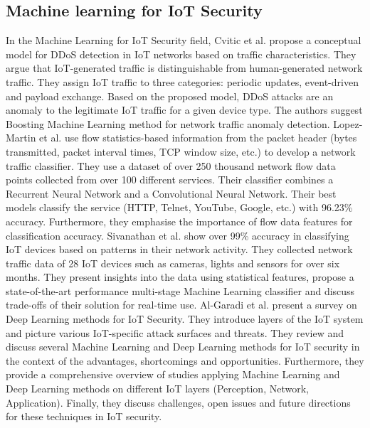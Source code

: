 \documentclass[conference]{IEEEtran}
\begin{document}
\subsection{Machine learning for IoT Security}
In the Machine Learning for IoT Security field, Cvitic et al. propose a conceptual model for DDoS detection in IoT networks based on traffic characteristics.
They argue that IoT-generated traffic is distinguishable from human-generated network traffic.
They assign IoT traffic to three categories: periodic updates, event-driven and payload exchange.
Based on the proposed model, DDoS attacks are an anomaly to the legitimate IoT traffic for a given device type.
The authors suggest Boosting Machine Learning method for network traffic anomaly detection.
Lopez-Martin et al. use flow statistics-based information from the packet header (bytes transmitted, packet interval times, TCP window size, etc.) to develop a network traffic classifier.
They use a dataset of over 250 thousand network flow data points collected from over 100 different services. Their classifier combines a Recurrent Neural Network and a Convolutional Neural Network.
Their best models classify the service (HTTP, Telnet, YouTube, Google, etc.) with 96.23\% accuracy.
Furthermore, they emphasise the importance of flow data features for classification accuracy. Sivanathan et al. show over 99\% accuracy in classifying IoT devices based on patterns in their network activity.
They collected network traffic data of 28 IoT devices such as cameras, lights and sensors for over six months.
They present insights into the data using statistical features, propose a state-of-the-art performance multi-stage Machine Learning classifier and discuss trade-offs of their solution for real-time use.
Al-Garadi et al. present a survey on Deep Learning methods for IoT Security.
They introduce layers of the IoT system and picture various IoT-specific attack surfaces and threats.
They review and discuss several Machine Learning and Deep Learning methods for IoT security in the context of the advantages, shortcomings and opportunities.
Furthermore, they provide a comprehensive overview of studies applying Machine Learning and Deep Learning methods on different IoT layers (Perception, Network, Application).
Finally, they discuss challenges, open issues and future directions for these techniques in IoT security.
\end{document}
